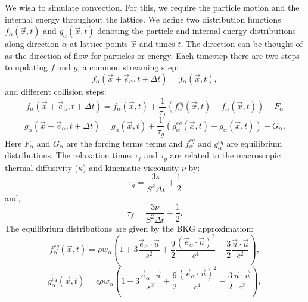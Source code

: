 \documentclass{article}
\begin{document}
\noindent We wish to simulate convection. For this, we require the particle motion and the internal energy throughout the lattice. We define two distribution functions $f_{\alpha}(\vec{x}, t)$ and $g_{\alpha}(\vec{x}, t)$ denoting the particle and internal energy distributions along direction $\alpha$ at lattice points $\vec{x}$ and times $t$. The direction can be thought of as the direction of flow for particles or energy. Each timestep there are two steps to updating $f$ and $g$, a common streaming step:
\begin{equation}
	f_{\alpha}(\vec{x} + \vec{e}_\alpha, t + \Delta t) = f_{\alpha}(\vec{x}, t),
	\label{streaming step}
\end{equation}
and different collision steps:
\begin{equation}
	f_{\alpha}(\vec{x} + \vec{e}_{\alpha}, t + \Delta t) = f_{\alpha}(\vec{x}, t) + \frac{1}{\tau_f} (f^{eq}_{\alpha}(\vec{x}, t)  - f_{\alpha}(\vec{x}, t)) + F_{\alpha}
	\label{f collision step}
\end{equation}
\begin{equation}
	g_{\alpha}(\vec{x} + \vec{e}_{\alpha}, t + \Delta t) = g_{\alpha}(\vec{x}, t) + \frac{1}{\tau_g} (g^{eq}_{\alpha}(\vec{x}, t)  - g_{\alpha}(\vec{x}, t)) + G_{\alpha}.
	\label{g collision step}
\end{equation}
Here $F_{\alpha}$ and $G_{\alpha}$ are the forcing terms terms and $f^{eq}_{\alpha}$ and $g^{eq}_{\alpha}$ are equilibrium distributions. The relaxation times $\tau_f$ and $\tau_g$ are related to the macroscopic thermal diffusivity ($\kappa$) and kinematic viscousity $\nu$ by:
\begin{equation}
	\tau_g = \frac{3 \kappa}{S^2 \Delta t} + \frac{1}{2}
\end{equation}
and,
\begin{equation}
	\tau_f = \frac{3 \nu}{S^2 \Delta t} + \frac{1}{2}.
\end{equation}
The equilibrium distributions are given by the BKG approximation:
\begin{equation}
	f^{eq}_{\alpha}(\vec{x}, t)  = \rho w_{\alpha} (1 + 3 \frac{\vec{e}_{\alpha} \cdot \vec{u}}{s^2} + \frac{9}{2} \frac{(\vec{e}_{\alpha} \cdot \vec{u}  )^2}{c^4} - \frac{3}{2} \frac{\vec{u} \cdot \vec{u}}{c^2}  ),
\end{equation}
\begin{equation}
	g^{eq}_{\alpha}(\vec{x}, t)  = \epsilon \rho w_{\alpha} (1 + 3 \frac{\vec{e}_{\alpha} \cdot \vec{u}}{s^2} + \frac{9}{2} \frac{(\vec{e}_{\alpha} \cdot \vec{u}  )^2}{c^4} - \frac{3}{2} \frac{\vec{u} \cdot \vec{u}}{c^2}  ),
\end{equation}
\end{document}
